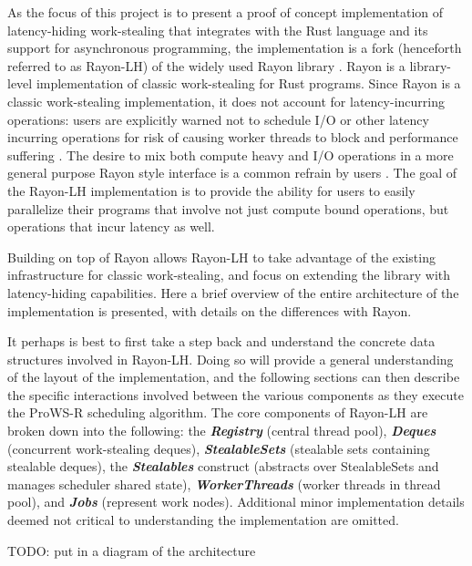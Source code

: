 \documentclass[bsc,frontabs,singlespacing,parskip,deptreport,normalheadings]{infthesis}
\begin{document}
As the focus of this project is to present a proof of concept implementation of
latency-hiding work-stealing that integrates with the Rust language and its
support for asynchronous programming, the implementation is a fork (henceforth
referred to as Rayon-LH) \cite{weidinger_rayon-lh_2021} of the widely used Rayon
library \cite{noauthor_rayon_2022, noauthor_baby_nodate, stone_how_2021}. Rayon
is a library-level implementation of classic work-stealing for Rust programs.
Since Rayon is a classic work-stealing implementation, it does not account for
latency-incurring operations: users are explicitly warned not to schedule I/O or
other latency incurring operations for risk of causing worker threads to block
and performance suffering \cite{noauthor_rayon_nodate}. The desire to mix both
compute heavy and I/O operations in a more general purpose Rayon style interface
is a common refrain by users \cite{noauthor_does_nodate, rodyamirov_how_2020}.
The goal of the Rayon-LH implementation is to provide the ability for users to
easily parallelize their programs that involve not just compute bound
operations, but operations that incur latency as well.

Building on top of Rayon allows Rayon-LH to take advantage of the existing
infrastructure for classic work-stealing, and focus on extending the library
with latency-hiding capabilities. Here a brief overview of the entire
architecture of the implementation is presented, with details on the differences
with Rayon.

It perhaps is best to first take a step back and understand the concrete data
structures involved in Rayon-LH. Doing so will provide a general understanding
of the layout of the implementation, and the following sections can then
describe the specific interactions involved between the various components as
they execute the ProWS-R scheduling algorithm. The core components of Rayon-LH
are broken down into the following: the \textbf{\textit{Registry}} (central
thread pool), \textbf{\textit{Deques}} (concurrent work-stealing deques),
\textbf{\textit{StealableSets}} (stealable sets containing stealable deques),
the \textbf{\textit{Stealables}} construct (abstracts over StealableSets and
manages scheduler shared state), \textbf{\textit{WorkerThreads}} (worker threads
in thread pool), and \textbf{\textit{Jobs}} (represent work nodes). Additional
minor implementation details deemed not critical to understanding the
implementation are omitted.

TODO: put in a diagram of the architecture
\end{document}
